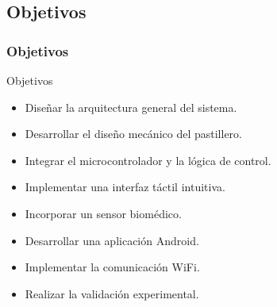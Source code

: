 \documentclass{beamer}
\begin{document}
\subsection{Objetivos}
\begin{frame}
\frametitle{Objetivos}

\begin{block}{Objetivos}
\begin{itemize}
\item Diseñar la \alert{arquitectura general} del sistema.
\item Desarrollar el \alert{diseño mecánico} del pastillero.
\item Integrar el \alert{microcontrolador} y la lógica de control.
\item Implementar una \alert{interfaz táctil} intuitiva.
\item Incorporar un \alert{sensor biomédico}.
\item Desarrollar una \alert{aplicación Android}.
\item Implementar la comunicación \alert{WiFi}.
\item Realizar la \alert{validación experimental}.
\end{itemize}
\end{block}


\end{frame}
\end{document}
